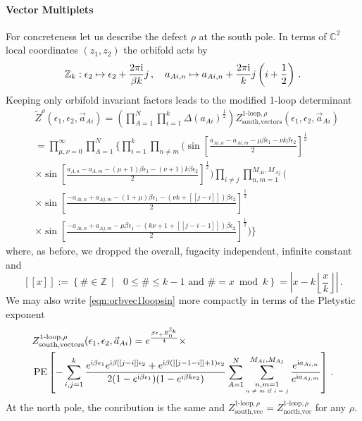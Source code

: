 \documentclass[main.tex]{subfiles}
\begin{document}
\paragraph{Vector Multiplets}
For concreteness let us describe the defect $\rho$ at the south pole. In terms of $\mathbb{C}^2$ local coordinates $(z_1,z_2)$ the orbifold acts by
\begin{equation}\label{eqn:orbaction1}
\mathbb{Z}_k:\epsilon_2\mapsto \epsilon_2+\frac{2\pi\mathrm{i}}{\beta k}j\,,\quad a_{Ai,n}\mapsto a_{Ai,n}+\frac{2\pi\mathrm{i} }{k}j\left(i+\frac{1}{2}\right)\,.
\end{equation}
Keeping only orbifold invariant factors leads to the modified 1-loop determinant
\begin{equation}\label{eqn:orbvec1loopsin}
\begin{aligned}
&\widetilde{Z}^{\rho}(\epsilon_1,\epsilon_2,\vec{a}_{Ai})=\left(\prod_{A=1}^N\prod_{i=1}^k\Delta(a_{Ai})^{\frac{1}{2}}\right)Z_{\text{south},\text{vectors}}^{\text{1-loop},\rho}(\epsilon_1,\epsilon_2,\vec{a}_{Ai})\\
&=\prod_{\mu,\nu=0}^{\infty}\prod_{A=1}^N\Bigg\{\prod_{i=1}^k\prod_{n\neq m}\Bigg(\sin\left[\frac{ a_{Ai,n}- a_{Ai,m}- \mu\beta\epsilon_1- \nu k\beta \epsilon_2}{2}\right]^{\frac{1}{2}}\\
&\times\sin\left[\frac{ a_{A,n}- a_{A,m}-(\mu+1)\beta\epsilon_1-(\nu+1)k\beta \epsilon_2}{2}\right]^{\frac{1}{2}}\Bigg)\prod_{i\neq j}\prod_{n,m=1}^{M_{Ai},M_{Aj}}\Bigg(\\
&\times\sin\left[\frac{ -a_{Ai,n}+ a_{Aj,m}- (1+\mu)\beta\epsilon_1- (\nu k+[[j-i]])\beta \epsilon_2}{2}\right]^{\frac{1}{2}}\\
&\times\sin\left[\frac{ -a_{Ai,n}+a_{Aj,m}-\mu\beta\epsilon_1-(k\nu+1+[[j-i-1]])\beta \epsilon_2}{2}\right]^{\frac{1}{2}}\Bigg)\Bigg\}
\end{aligned}
\end{equation}
where, as before,  we dropped the overall, fugacity independent, infinite constant and
\begin{equation}\label{eqn:brack}
\left[\left[x\right]\right]:=\left\{
\#\in\mathbb{Z} \,\middle|\text{ $0\leq \#\leq k-1$ and $\#=x\bmod k$}\right\}=\left|x-k\left\lfloor \frac{x}{k}\right\rfloor\right|\,.
\end{equation} 
We may also write \eqref{eqn:orbvec1loopsin} more compactly in terms of the Pletystic exponent
\begin{equation}
\begin{aligned}
&Z_{\text{south},\text{vectors}}^{\text{1-loop},\rho}(\epsilon_1,\epsilon_2,\vec{a}_{Ai})=e^{\frac{\beta\epsilon_+E^{\mathbb{Z}_k}_0}{4}} \times\\
&\operatorname{\mathrm{PE}}\left[-\sum_{i,j=1}^k\frac{e^{\mathrm{i}\beta \epsilon_1}e^{\mathrm{i}\beta [[j-i]]\epsilon_2}+e^{\mathrm{i}\beta\left([[j-1-i]]+1\right)\epsilon_2}}{2(1-e^{\mathrm{i}\beta\epsilon_1})(1-e^{\mathrm{i}\beta k\epsilon_2})}\sum_{A=1}^N\sum^{M_{Ai},M_{Aj}}_{\substack{n,m=1\\\text{\tiny $n\neq m$ if $i=j$}}}\frac{e^{\mathrm{i} a_{Ai,n}}}{e^{\mathrm{i} a_{Aj,m}}}\right]\,.
\end{aligned}
\end{equation}
At the north pole, the conribution is the same and $
Z^{\text{1-loop},\rho}_{\text{south},\text{vec}}=
Z^{\text{1-loop},\rho}_{\text{north},\text{vec}}$ for any $\rho$.
\end{document}
